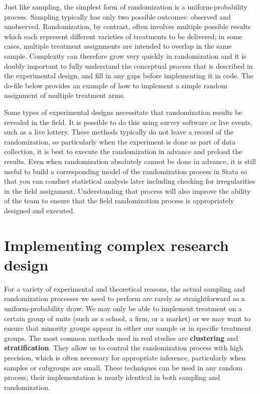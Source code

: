 Just like sampling, the simplest form of randomization is a uniform-probability process.
Sampling typically has only two possible outcomes: observed and unobserved.
Randomization, by contrast, often involves multiple possible results
which each represent different varieties of treatments to be delivered;
in some cases, multiple treatment assignments are intended to overlap in the same sample.
Complexity can therefore grow very quickly in randomization
and it is doubly important to fully understand the conceptual process
that is described in the experimental design,
and fill in any gaps before implementing it in code.
The do-file below provides an example of how to implement a simple random assignment of multiple treatment arms. 


Some types of experimental designs necessitate that randomization results be revealed in the field.
It is possible to do this using survey software or live events, such as a live lottery.
These methods typically do not leave a record of the randomization,
so particularly when the experiment is done as part of data collection,
it is best to execute the randomization in advance and preload the results.
Even when randomization absolutely cannot be done in advance, it is still useful
to build a corresponding model of the randomization process in Stata
so that you can conduct statistical analysis later
including checking for irregularities in the field assignment.
Understanding that process will also improve the ability of the team
to ensure that the field randomization process is appropriately designed and executed.



\section{Implementing complex research design}

For a variety of experimental and theoretical reasons,
the actual sampling and randomization processes we need to perform
are rarely as straightforward as a uniform-probability draw.
We may only be able to implement treatment on a certain group of units
(such as a school, a firm, or a market)
or we may want to ensure that minority groups appear
in either our sample or in specific treatment groups.
The most common methods used in real studies are \textbf{clustering} and \textbf{stratification}.
They allow us to control the randomization process with high precision,
which is often necessary for appropriate inference,
particularly when samples or subgroups are small.\cite{athey2017econometrics}
These techniques can be used in any random process;
their implementation is nearly identical in both sampling and randomization.

